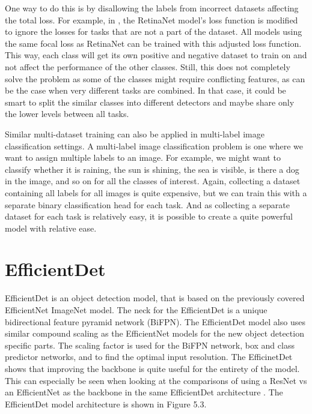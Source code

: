 One way to do this is by disallowing the labels from incorrect datasets affecting the total loss.
For example, in \citep{cross_data}, the RetinaNet \citep{retinaNet} model's loss function is modified to ignore the losses for tasks that are not a part of the dataset.
All models using the same focal loss as RetinaNet can be trained with this adjusted loss function.
This way, each class will get its own positive and negative dataset to train on and not affect the performance of the other classes.
Still, this does not completely solve the problem as some of the classes might require conflicting features, as can be the case when very different tasks are combined. 
In that case, it could be smart to split the similar classes into different detectors and maybe share only the lower levels between all tasks.

Similar multi-dataset training can also be applied in multi-label image classification settings.
A multi-label image classification problem is one where we want to assign multiple labels to an image.
For example, we might want to classify whether it is raining, the sun is shining, the sea is visible, is there a dog in the image, and so on for all the classes of interest.
Again, collecting a dataset containing all labels for all images is quite expensive, but we can train this with a separate binary classification head for each task.
And as collecting a separate dataset for each task is relatively easy, it is possible to create a quite powerful model with relative ease.

\section{EfficientDet}
EfficientDet \citep{efficientDet} is an object detection model, that is based on the previously covered EfficientNet ImageNet model.
The neck for the EfficientDet is a unique bidirectional feature pyramid network (BiFPN).
The EfficientDet model also uses similar compound scaling as the EfficientNet models for the new object detection specific parts.
The scaling factor is used for the BiFPN network, box and class predictor networks, and to find the optimal input resolution.
The EfficinetDet shows that improving the backbone is quite useful for the entirety of the model.
This can especially be seen when looking at the comparisons of using a ResNet vs an EfficientNet as the backbone in the same EfficientDet architecture \citep{efficientDet}.
The EfficientDet model architecture is shown in Figure 5.3.

